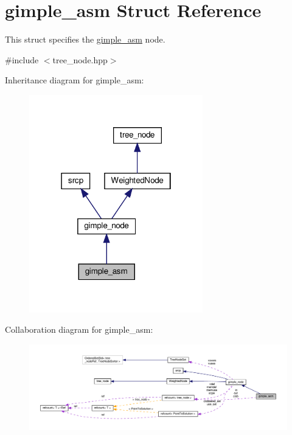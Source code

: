 \hypertarget{structgimple__asm}{}\section{gimple\+\_\+asm Struct Reference}
\label{structgimple__asm}


This struct specifies the \hyperlink{structgimple__asm}{gimple\+\_\+asm} node.  




{\ttfamily \#include $<$tree\+\_\+node.\+hpp$>$}



Inheritance diagram for gimple\+\_\+asm\+:
\nopagebreak
\begin{figure}[H]
\begin{center}
\leavevmode
\includegraphics[width=214pt]{dd/d44/structgimple__asm__inherit__graph}
\end{center}
\end{figure}


Collaboration diagram for gimple\+\_\+asm\+:
\nopagebreak
\begin{figure}[H]
\begin{center}
\leavevmode
\includegraphics[width=350pt]{db/d22/structgimple__asm__coll__graph}
\end{center}
\end{figure}
